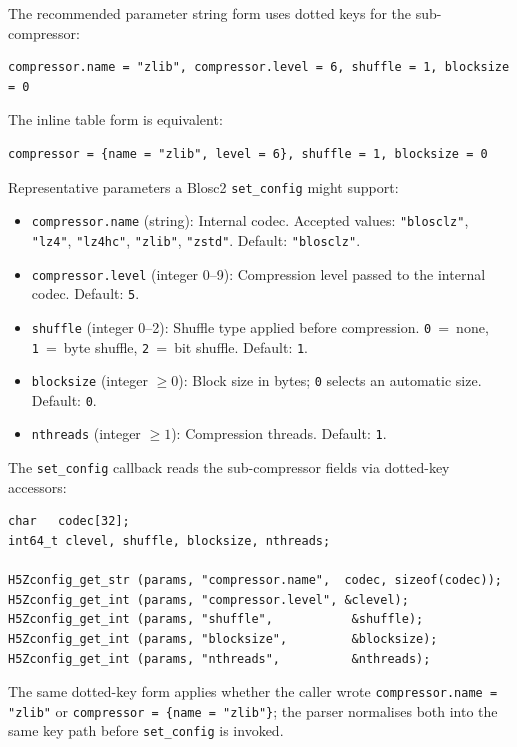 \documentclass[../RFC-HDFG-2026-001.tex]{subfiles}
\begin{document}
The recommended parameter string form uses dotted keys for the sub-compressor:

\begin{verbatim}
compressor.name = "zlib", compressor.level = 6, shuffle = 1, blocksize = 0
\end{verbatim}

The inline table form is equivalent:

\begin{verbatim}
compressor = {name = "zlib", level = 6}, shuffle = 1, blocksize = 0
\end{verbatim}

\noindent Representative parameters a Blosc2 \texttt{set\_config} might support:

\begin{itemize}
\item \texttt{compressor.name} (string): Internal codec.
  Accepted values: \texttt{"blosclz"}, \texttt{"lz4"}, \texttt{"lz4hc"},
  \texttt{"zlib"}, \texttt{"zstd"}.  Default: \texttt{"blosclz"}.
\item \texttt{compressor.level} (integer 0--9): Compression level passed to
  the internal codec.  Default: \texttt{5}.
\item \texttt{shuffle} (integer 0--2): Shuffle type applied before compression.
  \texttt{0}~=~none, \texttt{1}~=~byte shuffle, \texttt{2}~=~bit shuffle.
  Default: \texttt{1}.
\item \texttt{blocksize} (integer $\geq 0$): Block size in bytes; \texttt{0}
  selects an automatic size.  Default: \texttt{0}.
\item \texttt{nthreads} (integer $\geq 1$): Compression threads.  Default:
  \texttt{1}.
\end{itemize}

\noindent The \texttt{set\_config} callback reads the sub-compressor fields via
dotted-key accessors:

\begin{verbatim}
char   codec[32];
int64_t clevel, shuffle, blocksize, nthreads;

H5Zconfig_get_str (params, "compressor.name",  codec, sizeof(codec));
H5Zconfig_get_int (params, "compressor.level", &clevel);
H5Zconfig_get_int (params, "shuffle",           &shuffle);
H5Zconfig_get_int (params, "blocksize",         &blocksize);
H5Zconfig_get_int (params, "nthreads",          &nthreads);
\end{verbatim}

\noindent The same dotted-key form applies whether the caller wrote
\texttt{compressor.name = "zlib"} or \texttt{compressor = \{name = "zlib"\}};
the parser normalises both into the same key path before \texttt{set\_config}
is invoked.
\end{document}
